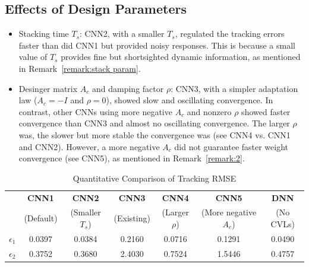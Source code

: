 \documentclass{l4dc2025}
\begin{document}
\subsection{Effects of Design Parameters}
\begin{itemize}
\item Stacking time $T_s$: CNN2, with a smaller $T_s$, regulated the tracking errors faster than did CNN1 but provided noisy responses. This is because a small value of $T_s$ provides fine but shortsighted dynamic information, as mentioned in Remark~\ref{remark:stack param}.
\item Desinger matrix $A_c$ and damping factor $\rho$: CNN3, with a simpler adaptation law ($A_c = -I$ and $\rho = 0$), showed slow and oscillating convergence. In contrast, other CNNs using more negative $A_c$ and nonzero $\rho$ showed faster convergence than CNN3 and almost no oscillating convergence. The larger $\rho$ was, the slower but more stable the convergence was (see CNN4 vs. CNN1 and CNN2). However, a more negative $A_c$ did not guarantee faster weight convergence (see CNN5), as mentioned in Remark~\ref{remark:2}.
\end{itemize}

\begin{table}%
    \caption{Quantitative Comparison of Tracking RMSE}
    \label{table: error norm}
    \centering
    \begin{tabular}{|c||c|c|c|c|c|c|}
    \hline
    & \bfseries CNN1 & \bfseries CNN2 & \bfseries CNN3 & \bfseries CNN4 & \bfseries CNN5 & \bfseries DNN\\
    & (Default) & (Smaller $T_s$) & (Existing) & (Larger $\rho$) & (More negative $A_c$) & (No CVLs) \\
    \hline 
    $\epsilon_1$ & 0.0397 & 0.0384 & 0.2160 & 0.0716 & 0.1291 & 0.0490 \\
    \hline
    $\epsilon_2$ & 0.3752 & 0.3680 & 2.4030 & 0.7524 & 1.5446 & 0.4757 \\
    \hline    
    \end{tabular}
    \label{table: erro}
\end{table}
\end{document}
